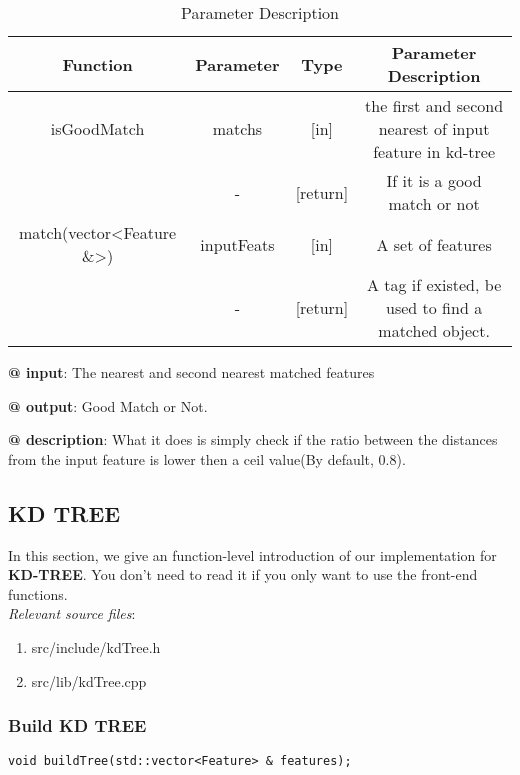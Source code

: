 \documentclass[paper=a4, fontsize=11pt]{scrartcl} %
\numberwithin{equation}{section} %
\numberwithin{figure}{section} %
\numberwithin{table}{section} %
\begin{document}
\begin{table}[h]
    \centering
    \begin{tabular}{|c|c|c|c|}
        \hline
        \textbf{Function} & \textbf{Parameter} & \textbf{Type} & \textbf{Parameter Description} \\\hline
            isGoodMatch & matchs & [in] & the first and second nearest of input feature in kd-tree \\
             & - & [return] & If it is a good match or not \\\hline
        match(vector<Feature \&>)& inputFeats & [in] & A set of features \\
        & - & [return] &A tag if existed, be used to find a matched object.\\\hline 
    \end{tabular}
    \caption{Parameter Description}\label{nolock}
\end{table}

\textbf{@ input}: The nearest and second nearest matched features

\textbf{@ output}: Good Match or Not.

\textbf{@ description}: What it does is simply check if the ratio between the distances from the input feature is lower then a ceil value(By default, 0.8).

\subsection{KD TREE}

In this section, we give an function-level introduction of our implementation for \textbf{KD-TREE}. You don't need to read it if you only want to use the front-end functions.  \\

\textsl{Relevant source files}: 

\begin{enumerate}
    \item src/include/kdTree.h
    \item src/lib/kdTree.cpp
\end{enumerate}

\subsubsection{Build KD TREE}

\begin{lstlisting}
void buildTree(std::vector<Feature> & features);
\end{lstlisting}
\end{document}
